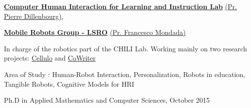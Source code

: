 \documentclass[10pt]{article}
\begin{document}
\begin{outerlist}
	\begin{small}
		
		
		\item[] \href{http://www.chili.epfl.ch/}{\textbf{Computer Human Interaction for Learning and Instruction Lab}} \href{https://people.epfl.ch/pierre.dillenbourg}{(Pr. Pierre Dillenbourg)}, 
		\item[] \href{http://www.mobots.epfl.ch}{\textbf{Mobile Robots Group - LSRO}} \href{https://people.epfl.ch/francesco.mondada}{(Pr. Francesco Mondada)} 
		\begin{innerlist}
			\item In charge of the robotics part of the CHILI Lab. Working mainly on two research projects: \href{http://chili.epfl.ch/cellulo}{Cellulo} and \href{http://chili.epfl.ch/cowriter}{CoWriter}
			\item Area of Study : Human-Robot Interaction, Personalization, Robots in education, Tangible Robots, Cognitive Models for HRI 
		\end{innerlist}
	\end{small}
\end{outerlist}
\vspace{0.5cm}
 Ph.D in Applied Mathematics and Computer Sciences, October 2015
\end{document}
